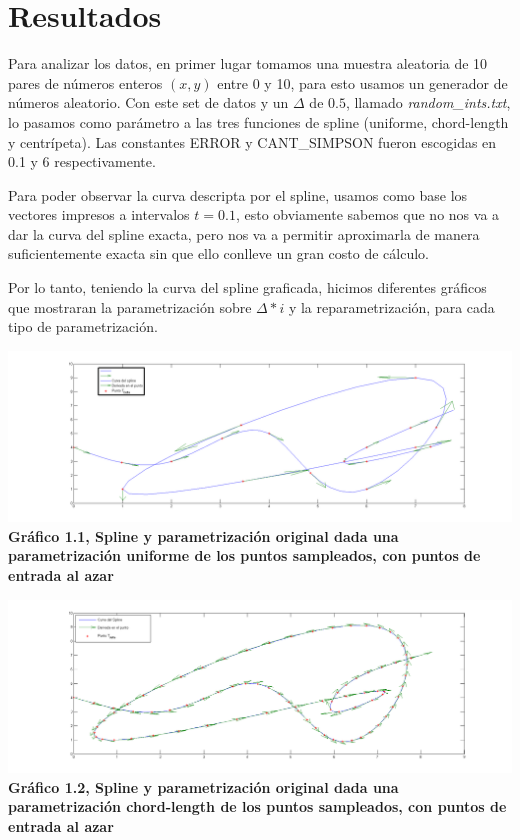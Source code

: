 \section{Resultados}

Para analizar los datos, en primer lugar tomamos una muestra aleatoria de 10 pares de números enteros $(x,y)$ entre 0 y 10, para esto usamos un generador de números aleatorio. Con este set de datos y un $\Delta$ de $0.5$, llamado \textit{random\_ints.txt}, lo pasamos como parámetro a las tres funciones de spline (uniforme, chord-length y centrípeta). Las constantes ERROR y CANT\_SIMPSON fueron escogidas en 0.1 y 6 respectivamente.

Para poder observar la curva descripta por el spline, usamos como base los vectores impresos a intervalos $t = 0.1$, esto obviamente sabemos que no nos va a dar la curva del spline exacta, pero nos va a permitir aproximarla de manera suficientemente exacta sin que ello conlleve un gran costo de cálculo.

Por lo tanto, teniendo la curva del spline graficada, hicimos diferentes gráficos que mostraran la parametrización sobre $\Delta * i$ y la reparametrización, para cada tipo de parametrización.



\begin{center}
\includegraphics[scale=0.4]{../img/Uniforme-orig-rand.png} \\
\scriptsize{\textsf{\textbf{Gr\'afico 1.1, Spline y parametrización original dada una parametrización uniforme de los puntos sampleados, con puntos de entrada al azar}}}
\end{center}

\begin{center}
\includegraphics[scale=0.4]{../img/Chord-orig-rand.png} \\
\scriptsize{\textsf{\textbf{Gr\'afico 1.2, Spline y parametrización original dada una parametrización chord-length de los puntos sampleados, con puntos de entrada al azar}}}
\end{center}

